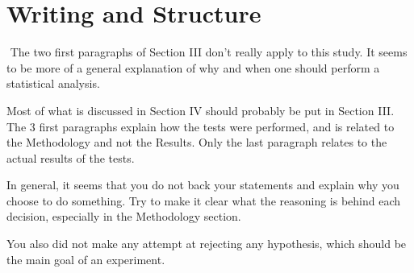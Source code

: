 \documentclass[times, 10pt,twocolumn]{article}
\begin{document}
\section{Writing and Structure}​​
​​The two first paragraphs of Section III don't really apply to this study. It seems to be more of a general explanation of why and when one should perform a statistical analysis. 

Most of what is discussed in Section IV should probably be put in Section III. The 3 first paragraphs explain how the tests were performed, and is related to the Methodology and not the Results. Only the last paragraph relates to the actual results of the tests. 

In general, it seems that you do not back your statements and explain why you choose to do something. Try to make it clear what the reasoning is behind each decision, especially in the Methodology section. 

You also did not make any attempt at rejecting any hypothesis, which should be the main goal of an experiment.
\end{document}
